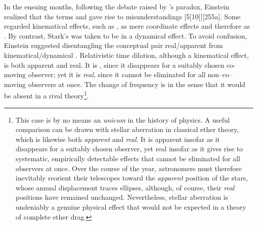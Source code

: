 \documentclass[pdflatex,sn-basic]{sn-jnl}
\begin{document}
In the ensuing months, following the debate raised by \Ehr's paradox, Einstein realized that the terms  and  gave rise to misunderstandings [5{[}10{]}][255a]. Some regarded kinematical effects, such as , as mere coordinate effects and therefore as . By contrast, Stark's  was taken to be  in a dynamical effect. To avoid confusion, Einstein suggested disentangling the conceptual pair real/apparent from kinematical/dynamical \citep{Einstein1911d}. Relativistic time dilation, although a kinematical effect, is both apparent and real. It is , since it disappears for a suitably chosen co-moving observer; yet it is \emph{real}, since it cannot be eliminated for all non--co--moving observers at once. The  change of frequency is  in the sense that it would be absent in a rival theory\footnote{This case is by no means an \emph{unicum} in the history of physics. A useful comparison can be drawn with stellar aberration in classical ether theory, which is likewise both \emph{apparent} and \emph{real}. It is apparent insofar as it disappears for a suitably chosen observer, yet real insofar as it gives rise to systematic, empirically detectable effects that cannot be eliminated for all observers at once. Over the course of the year, astronomers must therefore inevitably reorient their telescopes toward the \emph{apparent} position of the stars, whose annual displacement traces ellipses, although, of course, their \emph{real} positions have remained unchanged. Nevertheless, stellar aberration is undeniably a genuine physical effect that would not be expected in a theory of complete ether drag. }. %
\end{document}

